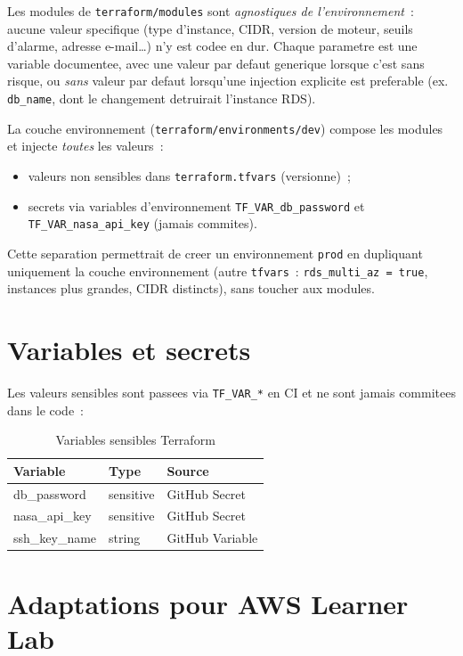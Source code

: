 Les modules de \texttt{terraform/modules} sont \emph{agnostiques de
l'environnement}~: aucune valeur specifique (type d'instance, CIDR, version
de moteur, seuils d'alarme, adresse e-mail\ldots) n'y est codee en dur.
Chaque parametre est une variable documentee, avec une valeur par defaut
generique lorsque c'est sans risque, ou \emph{sans} valeur par defaut
lorsqu'une injection explicite est preferable (ex. \texttt{db\_name},
dont le changement detruirait l'instance RDS).

La couche environnement (\texttt{terraform/environments/dev}) compose les
modules et injecte \emph{toutes} les valeurs~:
\begin{itemize}
    \item valeurs non sensibles dans \texttt{terraform.tfvars} (versionne)~;
    \item secrets via variables d'environnement \texttt{TF\_VAR\_db\_password}
        et \texttt{TF\_VAR\_nasa\_api\_key} (jamais commites).
\end{itemize}

Cette separation permettrait de creer un environnement \texttt{prod}
en dupliquant uniquement la couche environnement (autre \texttt{tfvars}~:
\texttt{rds\_multi\_az = true}, instances plus grandes, CIDR distincts),
sans toucher aux modules.

\section{Variables et secrets}

Les valeurs sensibles sont passees via \texttt{TF\_VAR\_*} en CI
et ne sont jamais commitees dans le code~:

\begin{table}[H]
    \centering
    \begin{tabular}{lll}
        \toprule
        \textbf{Variable} & \textbf{Type} & \textbf{Source} \\
        \midrule
        db\_password & sensitive & GitHub Secret \\
        nasa\_api\_key & sensitive & GitHub Secret \\
        ssh\_key\_name & string & GitHub Variable \\
        \bottomrule
    \end{tabular}
    \caption{Variables sensibles Terraform}
\end{table}

\section{Adaptations pour AWS Learner Lab}

